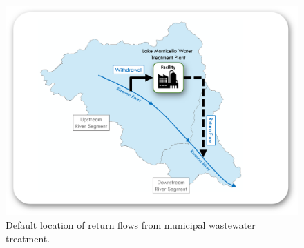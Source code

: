 
\begin{figure}[H]
\centering
\includegraphics[width=5.1in]{sections/Xfigures/cu_return_flows.png}
\caption{Default location of return flows from municipal wastewater treatment.}
\label{fig:cu_loc}
\end{figure}

